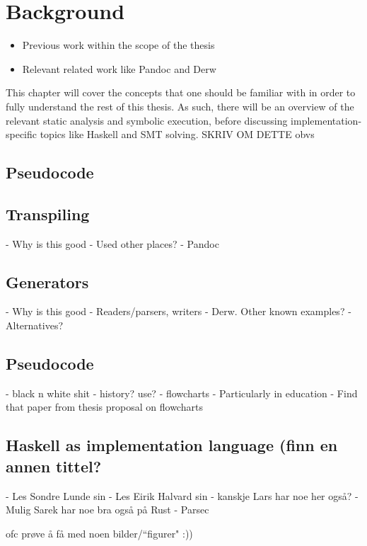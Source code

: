 \chapter{Background} %
\begin{itemize}
    \item Previous work within the scope of the thesis
    \item Relevant related work like Pandoc and Derw
\end{itemize}

This chapter will cover the concepts that one should be familiar with in order to fully understand the rest of this thesis. As such, there will be an overview of the relevant static analysis and symbolic execution, before discussing implementation-specific topics like Haskell and SMT solving. SKRIV OM DETTE obvs

\section{Pseudocode}

\section{Transpiling}

- Why is this good
- Used other places?
- Pandoc

\section{Generators}

- Why is this good
- Readers/parsers, writers
- Derw. Other known examples?
- Alternatives?

\section{Pseudocode}

- black n white shit
- history? use?
- flowcharts
- Particularly in education
- Find that paper from thesis proposal on flowcharts

\section{Haskell as implementation language (finn en annen tittel?}

- Les Sondre Lunde sin
- Les Eirik Halvard sin
- kanskje Lars har noe her også?
- Mulig Sarek har noe bra også på Rust
- Parsec

ofc prøve å få med noen bilder/“figurer" :))



